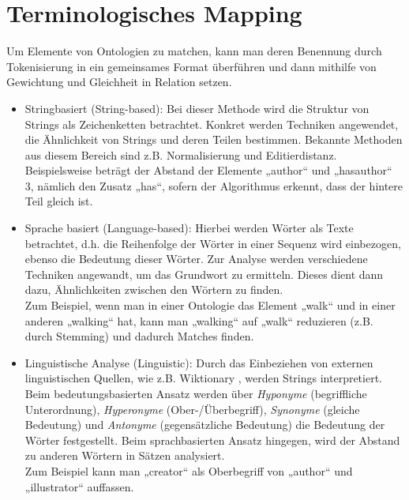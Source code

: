 	\section{Terminologisches Mapping}
	Um Elemente von Ontologien zu matchen, kann man deren Benennung durch Tokenisierung in ein gemeinsames Format überführen und dann mithilfe von Gewichtung und Gleichheit in Relation setzen.
	\begin{itemize}
		\item Stringbasiert (String-based): Bei dieser Methode wird die Struktur von
		Strings als Zeichenketten betrachtet. Konkret werden Techniken angewendet, die Ähnlichkeit
		von Strings und deren Teilen bestimmen. Bekannte Methoden aus diesem Bereich
		sind z.B. Normalisierung und Editierdistanz. \cite{EuzShv07}\\
		Beispielsweise beträgt der Abstand der Elemente „author“ und „hasauthor“ 3,
		nämlich den Zusatz „has“, sofern der Algorithmus erkennt, dass der hintere Teil gleich ist.
		\item  Sprache basiert (Language-based): Hierbei werden Wörter als Texte
		betrachtet, d.h.
		die Reihenfolge der Wörter in einer Sequenz wird einbezogen, ebenso die
		Bedeutung dieser Wörter. Zur Analyse werden verschiedene Techniken angewandt,
		um das Grundwort zu ermitteln. Dieses dient dann dazu, Ähnlichkeiten zwischen
		den Wörtern zu finden. \cite{EuzShv07}\\
		Zum Beispiel, wenn man in einer Ontologie das Element „walk“ und in einer
		anderen „walking“ hat, kann man „walking“ auf „walk“ reduzieren (z.B. durch
		Stemming) und dadurch Matches finden.
		\item Linguistische Analyse (Linguistic): Durch das Einbeziehen von externen
		linguistischen Quellen, wie z.B. Wiktionary , werden Strings interpretiert.
		Beim bedeutungsbasierten Ansatz werden über \textit{Hyponyme} (begriffliche
		Unterordnung), \textit{Hyperonyme} (Ober-/Überbegriff), \textit{Synonyme}
		(gleiche Bedeutung) und \textit{Antonyme} (gegensätzliche Bedeutung) die
		Bedeutung der Wörter festgestellt. Beim sprachbasierten Ansatz hingegen, wird
		der Abstand zu anderen Wörtern in Sätzen analysiert. \cite{EuzShv07}\\
		Zum Beispiel kann man „creator“ als Oberbegriff von „author“ und
		„illustrator“ auffassen.
	\end{itemize}
	
